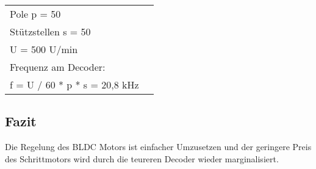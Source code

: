 \par\bigskip
\begin{tabularx}{\textwidth} {@{\hspace{1cm}}lX@{}}
	Pole p = 50 \\
	Stützstellen s = 50 \\    
    U = 500 U/min \\
    Frequenz am Decoder: \\
    f = U / 60 * p * s = 20,8 kHz \\
\end{tabularx}

\subsection{Fazit}
Die Regelung des BLDC Motors ist einfacher Umzusetzen und der geringere Preis des Schrittmotors wird durch die teureren Decoder wieder marginalisiert.